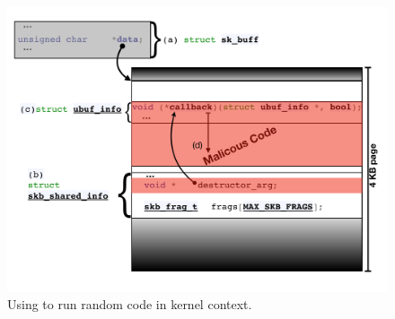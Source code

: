 \begin{figure}
    \centering
    \includegraphics[width=1.1\linewidth]{figs/ubuf.pdf}
    \caption{Using \shinfo to run random code in kernel context.}
    \label{fig:sh_info}
\end{figure}

